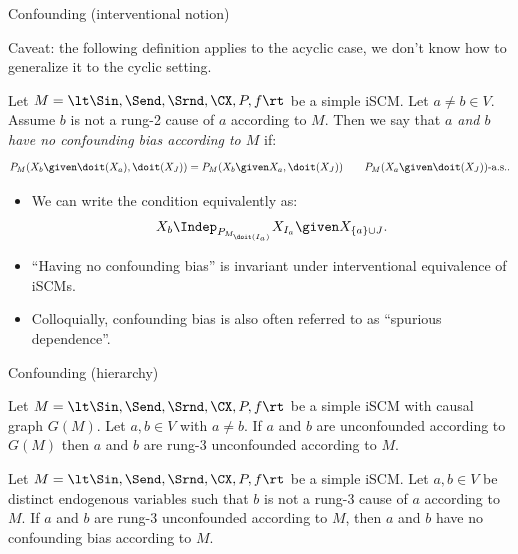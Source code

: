 \begin{frame}{Confounding (interventional notion)}

  Caveat: the following definition applies to the acyclic case, we don't know how to generalize it to the cyclic setting.

  \begin{Def}[\ref{def:no_confounding_bias}]
  Let $M = \lt \Sin, \Send, \Srnd, \CX, P, f \rt$ be a simple iSCM.
  Let $a \ne b \in V$.
  Assume $b$ is not a rung-2 cause of $a$ according to $M$.
  Then we say that \emph{$a$ and $b$ have no confounding bias according to $M$} if:
  \begin{equation*}
    P_{M}(X_b \given \doit(X_a), \doit(X_J)) = P_{M}(X_b \given X_a, \doit(X_J)) \qquad P_M(X_a \given \doit(X_J))\text{-a.s.}.
  \end{equation*}
\end{Def}
  \begin{itemize}
    \item We can write the condition equivalently as:
      $$X_b \Indep_{P_{M_{\doit(I_a)}}} X_{I_a} \given X_{\{a\} \cup J}.$$
    \item ``Having no confounding bias'' is invariant under interventional equivalence of iSCMs.
    \item Colloquially, confounding bias is also often referred to as ``spurious dependence''.
  \end{itemize}
\end{frame}

\begin{frame}{Confounding (hierarchy)}
\begin{Prp}[\ref{prp:graph_unconfounded_scm_rung3_unconfounded}]
  Let $M = \lt \Sin, \Send, \Srnd, \CX, P, f \rt$ be a simple iSCM with causal graph $G(M)$.
  Let $a, b \in V$ with $a \ne b$.
  If $a$ and $b$ are unconfounded according to $G(M)$ then $a$ and $b$ are rung-3 unconfounded according to $M$.
\end{Prp}

\begin{Prp}[\ref{prp:rung3_unconfounded_implies_no_confounding_bias}]
  Let $M = \lt \Sin, \Send, \Srnd, \CX, P, f \rt$ be a simple iSCM.
  Let $a,b \in V$ be distinct endogenous variables such that $b$ is not a rung-3 cause of $a$ according to $M$.
  If $a$ and $b$ are rung-3 unconfounded according to $M$, then $a$ and $b$ have no confounding bias according to $M$.
\end{Prp}
\end{frame}

